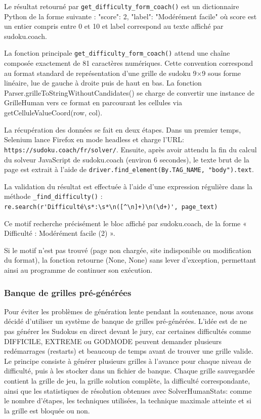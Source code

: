 \documentclass[a4paper]{article}
\begin{document}
Le résultat retourné par \texttt{get\_difficulty\_form\_coach()} est un dictionnaire Python de la forme suivante :
{"score": 2, "label": "Modérément facile"}
où score est un entier compris entre 0 et 10 et label correspond au texte affiché par sudoku.coach.

La fonction principale \texttt{get\_difficulty\_form\_coach()} attend une chaîne composée exactement de 81 caractères numériques. Cette convention correspond au format standard de représentation d’une grille de sudoku 9×9 sous forme linéaire, lue de gauche à droite puis de haut en bas. La fonction Parser.grilleToStringWithoutCandidates() se charge de convertir une instance de GrilleHuman vers ce format en parcourant les cellules via getCelluleValueCoord(row, col).

La récupération des données se fait en deux étapes. Dans un premier temps, Selenium lance Firefox en mode headless et charge l’URL: \texttt{https://sudoku.coach/fr/solver/}. 
Ensuite, après avoir attendu la fin du calcul du solveur JavaScript de sudoku.coach (environ 6 secondes), le texte brut de la page est extrait à l’aide de \texttt{driver.find\_element(By.TAG\_NAME, "body").text}.

La validation du résultat est effectuée à l’aide d’une expression régulière dans la méthode \texttt{\_find\_difficulty()} :
\verb|re.search(r'Difficulté\s*:\s*\n([^\n]+)\n(\d+)', page_text)|

Ce motif recherche précisément le bloc affiché par sudoku.coach, de la forme « Difficulté : Modérément facile (2) ».

Si le motif n’est pas trouvé (page non chargée, site indisponible ou modification du format), la fonction retourne (None, None) sans lever d’exception, permettant ainsi au programme de continuer son exécution.

\subsubsection{Banque de grilles pré-générées}

Pour éviter les problèmes de génération lente pendant la soutenance, nous avons décidé d’utiliser un système de banque de grilles pré-générées. L’idée est de ne pas générer les Sudokus en direct devant le jury, car certaines difficultés comme DIFFICILE, EXTREME ou GODMODE peuvent demander plusieurs redémarrages (restarts) et beaucoup de temps avant de trouver une grille valide.
Le principe consiste à générer plusieurs grilles à l’avance pour chaque niveau de difficulté, puis à les stocker dans un fichier de banque. Chaque grille sauvegardée contient la grille de jeu, la grille solution complète, la difficulté correspondante, ainsi que les statistiques de résolution obtenues avec SolverHumanStats: comme le nombre d’étapes, les techniques utilisées, la technique maximale atteinte et si la grille est bloquée ou non.
\end{document}
